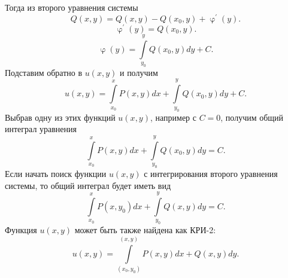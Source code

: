 \documentclass[a4paper, 12pt]{report}
\renewcommand{\varphi}{\upvarphi}
\begin{document}
Тогда из второго уравнения системы $$Q(x,y) = Q(x,y) - Q(x_0,y) + \varphi^\prime(y).$$
$$\varphi^\prime(y) = Q(x_0,y).$$
$$\varphi(y) = \int\limits_{y_0}^y Q(x_0,y)dy + C.$$
Подставим обратно в $u(x,y)$ и получим $$u(x,y) =\int\limits^x_{x_0}P(x,y)dx  +  \int\limits_{y_0}^y Q(x_0,y)dy + C.$$
Выбрав одну из этих функций $u(x,y)$, например с $C = 0$, получим общий интеграл уравнения $$\int\limits^x_{x_0}P(x,y)dx  +  \int\limits_{y_0}^y Q(x_0,y)dy = C.$$
Если начать поиск функции $u(x,y)$ с интегрирования второго уравнения системы, то общий интеграл будет иметь вид $$\int\limits^x_{x_0}P(x,y_0)dx  +  \int\limits_{y_0}^y Q(x,y)dy = C.$$
Функция $u(x,y)$ может быть также найдена как КРИ-2: $$u(x,y) = \int\limits_{(x_0,y_0)}^{(x,y)}P(x,y)dx + Q(x,y) dy.$$
\end{document}
